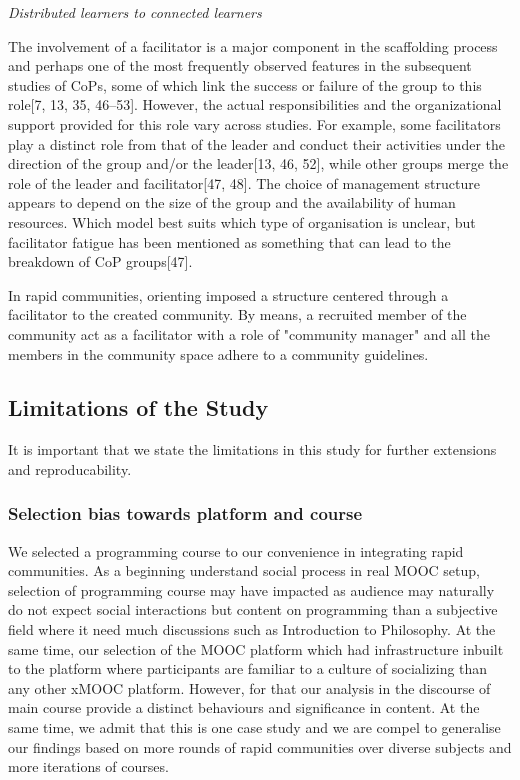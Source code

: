 \documentclass[manuscript,screen,review]{acmart}
\begin{document}
\textit{Distributed learners to connected learners} 

The involvement of a facilitator is a major component in the scaffolding process and perhaps one of the most frequently observed features in the subsequent studies of CoPs, some of which link the success or failure of the group to this role[7, 13, 35, 46–53].  However, the actual responsibilities and the organizational support provided for this role vary across studies. For example, some facilitators play a distinct role from that of the leader and conduct their activities under the direction of the group and/or the leader[13, 46, 52], while other groups merge the role of the leader and facilitator[47, 48]. The choice of management structure appears to depend on the size of the group and the availability of human resources. Which model best suits which type of organisation is unclear, but facilitator fatigue has been mentioned as something that can lead to the breakdown of CoP groups[47].

In rapid communities, orienting imposed a structure centered through a facilitator to the created community. By means, a recruited member of the community act as a facilitator with a role of "community manager" and all the members in the community space adhere to a community guidelines. 

\subsection{Limitations of the Study}
It is important that we state the limitations in this study for further extensions and reproducability.  
\subsubsection{Selection bias towards platform and course} 
We selected a programming course to our convenience in integrating rapid communities. As a  beginning understand social process in real MOOC setup, selection of programming course may  have impacted as audience may naturally do not expect social interactions but content on programming than a subjective field where it need much discussions such as Introduction to Philosophy. At the same time, our selection of the MOOC platform which had infrastructure inbuilt to the platform where participants are familiar to a culture of  socializing than any other xMOOC platform. However, for that our analysis in the discourse of main course provide a distinct behaviours and significance in content. At the same time, we admit that this is one case study and we are compel to generalise our findings based on more rounds of rapid communities over diverse subjects and more iterations of courses. 
\end{document}
